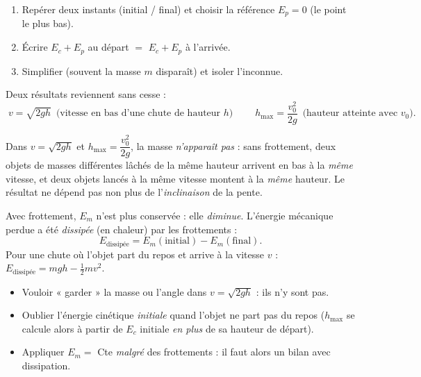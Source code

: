 \documentclass[11pt,a4paper]{article}
\begin{document}
\begin{methode}
\begin{enumerate}[leftmargin=1.6em,topsep=1pt,itemsep=1pt]
  \item Repérer deux instants (initial / final) et choisir la référence $E_p=0$ (le point le plus bas).
  \item Écrire $E_c+E_p$ au départ $=$ $E_c+E_p$ à l'arrivée.
  \item Simplifier (souvent la masse $m$ disparaît) et isoler l'inconnue.
\end{enumerate}
Deux résultats reviennent sans cesse :
\[
\boxed{\;v=\sqrt{2gh}\;}\ \text{(vitesse en bas d'une chute de hauteur $h$)}\qquad
\boxed{\;h_{\max}=\dfrac{v_0^2}{2g}\;}\ \text{(hauteur atteinte avec $v_0$)}.
\]
\end{methode}

\begin{cle}
Dans $v=\sqrt{2gh}$ et $h_{\max}=\dfrac{v_0^2}{2g}$, la masse \emph{n'apparaît pas} : sans frottement,
deux objets de masses différentes lâchés de la même hauteur arrivent en bas à la \emph{même} vitesse,
et deux objets lancés à la même vitesse montent à la \emph{même} hauteur. Le résultat ne dépend pas
non plus de l'\emph{inclinaison} de la pente.
\end{cle}

\begin{remarque}
Avec frottement, $E_m$ n'est plus conservée : elle \emph{diminue}. L'énergie mécanique perdue a été
\emph{dissipée} (en chaleur) par les frottements :
\[
E_{\text{dissipée}}=E_m(\text{initial})-E_m(\text{final}).
\]
Pour une chute où l'objet part du repos et arrive à la vitesse $v$ :
$E_{\text{dissipée}}=mgh-\tfrac12 m v^2$.
\end{remarque}

\begin{piege}
\begin{itemize}[leftmargin=1.5em,topsep=1pt,itemsep=1pt]
  \item Vouloir « garder » la masse ou l'angle dans $v=\sqrt{2gh}$ : ils n'y sont pas.
  \item Oublier l'énergie cinétique \emph{initiale} quand l'objet ne part pas du repos
        ($h_{\max}$ se calcule alors à partir de $E_c$ initiale \emph{en plus} de sa hauteur de départ).
  \item Appliquer $E_m=$ Cte \emph{malgré} des frottements : il faut alors un bilan avec dissipation.
\end{itemize}
\end{piege}
\end{document}
